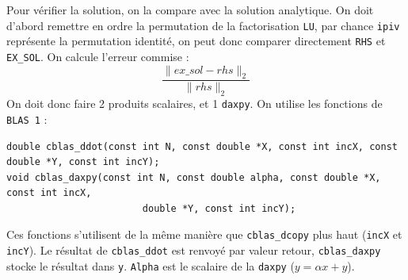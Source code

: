 \documentclass{article}
\begin{document}
Pour vérifier la solution, on la compare avec la solution analytique. On doit d'abord remettre en ordre la permutation de la factorisation \texttt{LU}, par chance \texttt{ipiv} représente la permutation identité, on peut donc comparer directement \texttt{RHS} et \texttt{EX\_SOL}. On calcule l'erreur commise :
\[
	\frac{\lVert ex\_sol - rhs \rVert_2}{\lVert rhs \rVert_2}
\]
On doit donc faire 2 produits scalaires, et 1 \texttt{daxpy}. On utilise les fonctions de \texttt{BLAS 1} :
\begin{scriptsize}
\begin{verbatim}
double cblas_ddot(const int N, const double *X, const int incX, const double *Y, const int incY);
void cblas_daxpy(const int N, const double alpha, const double *X, const int incX, 
						double *Y, const int incY);
\end{verbatim}
\end{scriptsize}
Ces fonctions s'utilisent de la même manière que \texttt{cblas\_dcopy} plus haut (\texttt{incX} et \texttt{incY}). Le résultat de \texttt{cblas\_ddot} est renvoyé par valeur retour, \texttt{cblas\_daxpy} stocke le résultat dans \texttt{y}.
\texttt{Alpha} est le scalaire de la \texttt{daxpy} (\(y = \alpha x + y\)).
\end{document}
